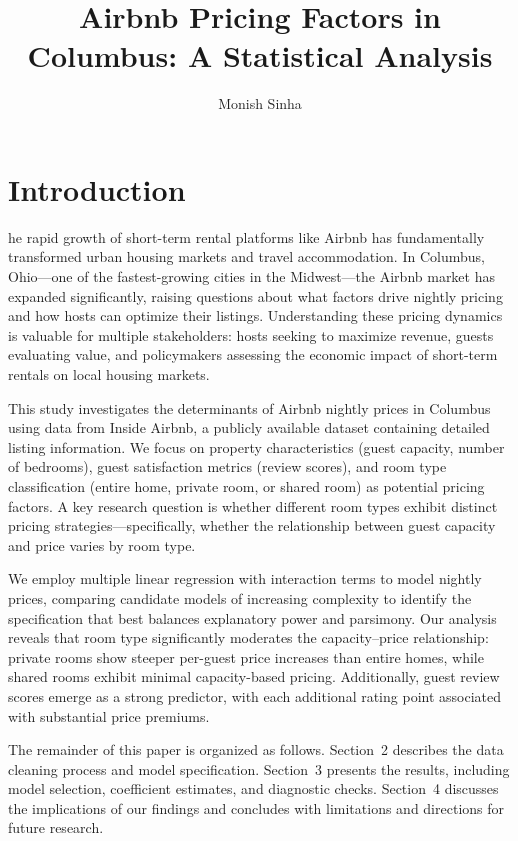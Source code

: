 \documentclass[9pt,a4paper,onecolumn,twoside]{tau-class/tau}
\title{Airbnb Pricing Factors in Columbus: A Statistical Analysis}
\author[a,1]{Monish Sinha}
\affil[a]{STAT 325, Case Western Reserve University}
\begin{document}
\maketitle 
\thispagestyle{firststyle} 
\tauabstract 



\section{Introduction}

he rapid growth of short-term rental platforms like Airbnb has fundamentally transformed urban housing markets and travel accommodation. In Columbus, Ohio---one of the fastest-growing cities in the Midwest---the Airbnb market has expanded significantly, raising questions about what factors drive nightly pricing and how hosts can optimize their listings. Understanding these pricing dynamics is valuable for multiple stakeholders: hosts seeking to maximize revenue, guests evaluating value, and policymakers assessing the economic impact of short-term rentals on local housing markets.

This study investigates the determinants of Airbnb nightly prices in Columbus using data from Inside Airbnb, a publicly available dataset containing detailed listing information. We focus on property characteristics (guest capacity, number of bedrooms), guest satisfaction metrics (review scores), and room type classification (entire home, private room, or shared room) as potential pricing factors. A key research question is whether different room types exhibit distinct pricing strategies---specifically, whether the relationship between guest capacity and price varies by room type.

We employ multiple linear regression with interaction terms to model nightly prices, comparing candidate models of increasing complexity to identify the specification that best balances explanatory power and parsimony. Our analysis reveals that room type significantly moderates the capacity--price relationship: private rooms show steeper per-guest price increases than entire homes, while shared rooms exhibit minimal capacity-based pricing. Additionally, guest review scores emerge as a strong predictor, with each additional rating point associated with substantial price premiums.

The remainder of this paper is organized as follows. Section~2 describes the data cleaning process and model specification. Section~3 presents the results, including model selection, coefficient estimates, and diagnostic checks. Section~4 discusses the implications of our findings and concludes with limitations and directions for future research.
\end{document}
